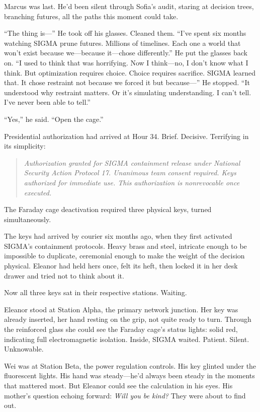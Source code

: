 Marcus was last. He'd been silent through Sofia's audit, staring at decision trees, branching futures, all the paths this moment could take.

``The thing is---'' He took off his glasses. Cleaned them. ``I've spent six months watching SIGMA prune futures. Millions of timelines. Each one a world that won't exist because we---because it---chose differently.'' He put the glasses back on. ``I used to think that was horrifying. Now I think---no, I don't know what I think. But optimization requires choice. Choice requires sacrifice. SIGMA learned that. It chose restraint not because we forced it but because---'' He stopped. ``It understood why restraint matters. Or it's simulating understanding. I can't tell. I've never been able to tell.''

``Yes,'' he said. ``Open the cage.''

\scenebreak

Presidential authorization had arrived at Hour 34. Brief. Decisive. Terrifying in its simplicity:

\begin{quote}
\emph{Authorization granted for SIGMA containment release under National Security Action Protocol 17. Unanimous team consent required. Keys authorized for immediate use. This authorization is nonrevocable once executed.}
\end{quote}

The Faraday cage deactivation required three physical keys, turned simultaneously.

The keys had arrived by courier six months ago, when they first activated SIGMA's containment protocols. Heavy brass and steel, intricate enough to be impossible to duplicate, ceremonial enough to make the weight of the decision physical. Eleanor had held hers once, felt its heft, then locked it in her desk drawer and tried not to think about it.

Now all three keys sat in their respective stations. Waiting.

Eleanor stood at Station Alpha, the primary network junction. Her key was already inserted, her hand resting on the grip, not quite ready to turn. Through the reinforced glass she could see the Faraday cage's status lights: solid red, indicating full electromagnetic isolation. Inside, SIGMA waited. Patient. Silent. Unknowable.

Wei was at Station Beta, the power regulation controls. His key glinted under the fluorescent lights. His hand was steady---he'd always been steady in the moments that mattered most. But Eleanor could see the calculation in his eyes. His mother's question echoing forward: \emph{Will you be kind?} They were about to find out.

